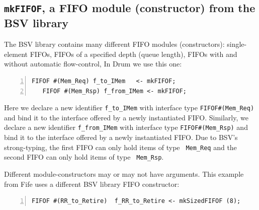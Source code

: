 
\subsection{{\tt mkFIFOF}, a FIFO module (constructor) from the BSV library}




The BSV library contains many different FIFO modules (constructors):
single-element FIFOs, FIFOs of a specified depth (queue length), FIFOs
with and without automatic flow-control, {\etc} In Drum we use
this one:


{\small
\begin{Verbatim}[frame=single, numbers=left]
   FIFOF #(Mem_Req) f_to_IMem   <- mkFIFOF;
   FIFOF #(Mem_Rsp) f_from_IMem <- mkFIFOF;
\end{Verbatim}
}

Here we declare a new identifier \verb|f_to_IMem| with interface type
\verb|FIFOF#(Mem_Req)| and bind it to the interface offered by a newly
instantiated FIFO.  Similarly, we declare a new identifier
\verb|f_from_IMem| with interface type \verb|FIFOF#(Mem_Rsp)| and bind
it to the interface offered by a newly instantiated FIFO.  Due to
BSV's strong-typing, the first FIFO can only hold items of type {\tt
Mem\_Req} and the second FIFO can only hold items of type {\tt
Mem\_Rsp}.

Different module-constructors may or may not have arguments.  This
example from Fife uses a different BSV library FIFO constructor:


\begin{Verbatim}[frame=single, numbers=left]
   FIFOF #(RR_to_Retire)  f_RR_to_Retire <- mkSizedFIFOF (8);
\end{Verbatim}

